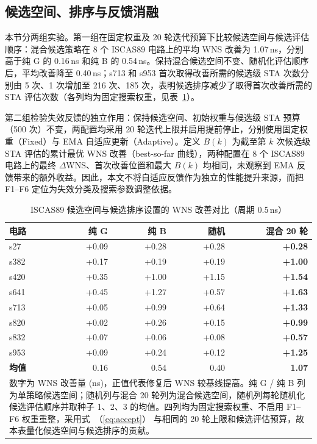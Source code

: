 \documentclass[twocolumn,10pt,fontset=windows]{ctexart}
\renewcommand{\eqref}[1]{\textup{（\ref{#1}）}}
\begin{document}
\subsection{候选空间、排序与反馈消融}\label{sec:ablation}

本节分两组实验。第一组在固定权重及 20 轮迭代预算下比较候选空间与候选评估顺序：混合候选策略在 8 个 ISCAS89 电路上的平均 WNS 改善为 1.07\,ns，分别高于纯 G 的 0.16\,ns 和纯 B 的 0.54\,ns。保持混合候选空间不变、随机化评估顺序后，平均改善降至 0.40\,ns；s713 和 s953 首次取得改善所需的候选级 STA 次数分别由 5 次、1 次增加至 216 次、185 次，表明候选排序减少了取得首次改善所需的 STA 评估次数（各列均为固定搜索权重，见表~\ref{tab:ablation}）。

第二组检验失效反馈的独立作用：保持候选空间、初始权重与候选级 STA 预算（500 次）不变，两配置均采用 20 轮迭代上限并启用提前停止，分别使用固定权重（Fixed）与 EMA 自适应更新（Adaptive）。定义 $B(k)$ 为截至第 $k$ 次候选级 STA 评估的累计最优 WNS 改善（best-so-far 曲线），两种配置在 8 个 ISCAS89 电路上的最终 $\Delta\mathrm{WNS}$、首次改善位置和最大 $B(k)$ 均相同，未观察到 EMA 反馈带来的额外收益。因此，本文不将自适应反馈作为独立的性能提升来源，而把 F1--F6 定位为失效分类及搜索参数调整依据。

\begin{table}[H]
\centering
\caption{ISCAS89 候选空间与候选排序设置的 WNS 改善对比（周期 0.5\,ns）}
\label{tab:ablation}
\scriptsize
\setlength{\tabcolsep}{3pt}
\begin{tabular}{lrrrr}
\toprule
\textbf{电路} & \textbf{纯 G} & \textbf{纯 B} & \textbf{随机} & \textbf{混合 20 轮} \\
\midrule
s27  & +0.09 & +0.28 & +0.28 & \textbf{+0.28} \\
s382 & +0.17 & +0.19 & +0.19 & \textbf{+1.00} \\
s420 & +0.35 & +1.00 & +1.15 & \textbf{+1.54} \\
s641 & +0.45 & +1.27 & +0.57 & \textbf{+1.63} \\
s713 & +0.05 & +0.99 & +0.64 & \textbf{+1.33} \\
s820 & +0.02 & +0.26 & +0.15 & \textbf{+0.99} \\
s832 & +0.07 & +0.06 & +0.08 & \textbf{+0.57} \\
s953 & +0.09 & +0.24 & +0.12 & \textbf{+1.25} \\
\midrule
\textbf{均值} & 0.16 & 0.54 & 0.40 & \textbf{1.07} \\
\bottomrule
\multicolumn{5}{p{0.92\columnwidth}}{\footnotesize 数字为 WNS 改善量 (ns)，正值代表修复后 WNS 较基线提高。纯 G / 纯 B 列为单策略候选空间；随机列与混合 20 轮列为混合候选空间，随机列每轮随机化候选评估顺序并取种子 1、2、3 的均值。四列均为固定搜索权重、不启用 F1--F6 权重重整，采用式~\eqref{eq:accept} 与相同的 20 轮上限和候选评估预算，故本表量化候选空间与候选排序的贡献。} \\
\end{tabular}
\end{table}
\end{document}
